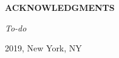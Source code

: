 %
%
%
%

\newpage

\begin{center}

{\large \bf ACKNOWLEDGMENTS } %

\end{center}

\vspace{0.8cm}
\textit{To-do}

\vspace{1.8cm}
2019, New York, NY

